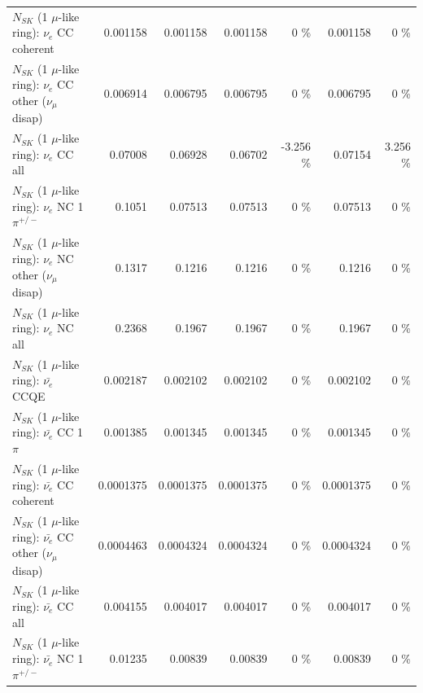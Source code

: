 \begin{table}
\begin{tabular}{| l | r | r | r  r | r  r |}
                               $N_{SK}$ (1 $\mu$-like ring): $\nu_e$ CC coherent &        0.001158 &        0.001158 &        0.001158 &        0 \%  &        0.001158 &        0 \%  \\ 
                $N_{SK}$ (1 $\mu$-like ring): $\nu_e$ CC other ($\nu_\mu$ disap) &        0.006914 &        0.006795 &        0.006795 &        0 \%  &        0.006795 &        0 \%  \\ 
                                  $N_{SK}$ (1 $\mu$-like ring): $\nu_{e}$ CC all &         0.07008 &         0.06928 &         0.06702 &   -3.256 \%  &         0.07154 &    3.256 \%  \\ 
\hline
                           $N_{SK}$ (1 $\mu$-like ring): $\nu_e$ NC 1$\pi^{+/-}$ &          0.1051 &         0.07513 &         0.07513 &        0 \%  &         0.07513 &        0 \%  \\ 
                $N_{SK}$ (1 $\mu$-like ring): $\nu_e$ NC other ($\nu_\mu$ disap) &          0.1317 &          0.1216 &          0.1216 &        0 \%  &          0.1216 &        0 \%  \\ 
                                  $N_{SK}$ (1 $\mu$-like ring): $\nu_{e}$ NC all &          0.2368 &          0.1967 &          0.1967 &        0 \%  &          0.1967 &        0 \%  \\ 
\hline
\hline
\hline
                                $N_{SK}$ (1 $\mu$-like ring): $\bar{\nu_e}$ CCQE &        0.002187 &        0.002102 &        0.002102 &        0 \%  &        0.002102 &        0 \%  \\ 
                           $N_{SK}$ (1 $\mu$-like ring): $\bar{\nu_e}$ CC 1$\pi$ &        0.001385 &        0.001345 &        0.001345 &        0 \%  &        0.001345 &        0 \%  \\ 
                         $N_{SK}$ (1 $\mu$-like ring): $\bar{\nu_e}$ CC coherent &       0.0001375 &       0.0001375 &       0.0001375 &        0 \%  &       0.0001375 &        0 \%  \\ 
          $N_{SK}$ (1 $\mu$-like ring): $\bar{\nu_e}$ CC other ($\nu_\mu$ disap) &       0.0004463 &       0.0004324 &       0.0004324 &        0 \%  &       0.0004324 &        0 \%  \\ 
                            $N_{SK}$ (1 $\mu$-like ring): $\bar{\nu_{e}}$ CC all &        0.004155 &        0.004017 &        0.004017 &        0 \%  &        0.004017 &        0 \%  \\ 
\hline
                     $N_{SK}$ (1 $\mu$-like ring): $\bar{\nu_e}$ NC 1$\pi^{+/-}$ &         0.01235 &         0.00839 &         0.00839 &        0 \%  &         0.00839 &        0 \%  \\ 

\end{tabular}
\end{table}
